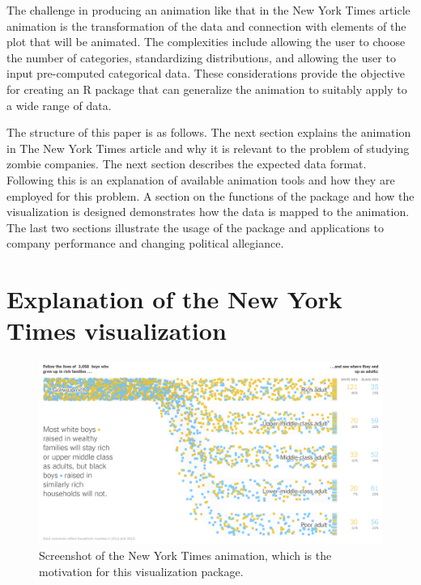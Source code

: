 The challenge in producing an animation like that in the New York Times article animation is the transformation of the data and connection with elements of the plot that will be animated. The complexities include allowing the user to choose the number of categories, standardizing distributions, and allowing the user to input pre-computed categorical data. These considerations provide the objective for creating an R package that can generalize the animation to suitably apply to a wide range of data.

The structure of this paper is as follows. The next section explains the animation in The New York Times article and why it is relevant to the problem of studying zombie companies. The next section describes the expected data format. Following this is an explanation of available animation tools and how they are employed for this problem. A section on the functions of the package and how the visualization is designed demonstrates how the data is mapped to the animation. The last two sections illustrate the usage of the package and applications to company performance and changing political allegiance.

\hypertarget{NYTvis}{%
\section{Explanation of the New York Times visualization}\label{NYTvis}}

\begin{figure}

{\centering \includegraphics[width=1\linewidth]{figures/NYT} 

}

\caption{Screenshot of the New York Times animation, which is the motivation for this visualization package.}\label{fig:nyt}
\end{figure}

